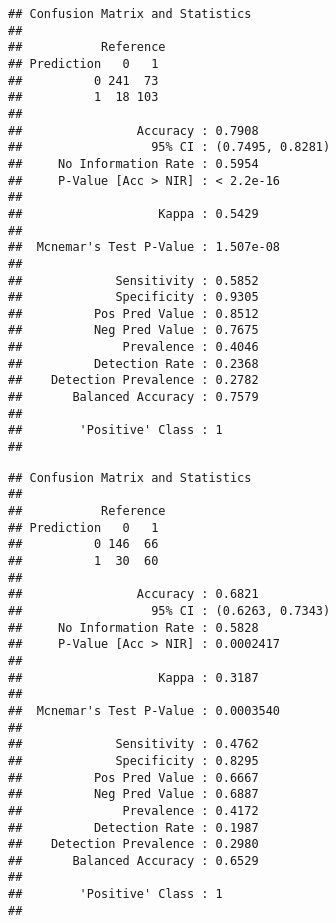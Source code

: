 \documentclass[
]{article}
\newenvironment{Shaded}{\begin{snugshade}}{\end{snugshade}}
\newcommand{\AttributeTok}[1]{\textcolor[rgb]{0.77,0.63,0.00}{#1}}
\newcommand{\CommentTok}[1]{\textcolor[rgb]{0.56,0.35,0.01}{\textit{#1}}}
\newcommand{\FunctionTok}[1]{\textcolor[rgb]{0.00,0.00,0.00}{#1}}
\newcommand{\NormalTok}[1]{#1}
\newcommand{\OtherTok}[1]{\textcolor[rgb]{0.56,0.35,0.01}{#1}}
\newcommand{\SpecialCharTok}[1]{\textcolor[rgb]{0.00,0.00,0.00}{#1}}
\newcommand{\StringTok}[1]{\textcolor[rgb]{0.31,0.60,0.02}{#1}}
\begin{document}
\begin{verbatim}
## Confusion Matrix and Statistics
## 
##           Reference
## Prediction   0   1
##          0 241  73
##          1  18 103
##                                           
##                Accuracy : 0.7908          
##                  95% CI : (0.7495, 0.8281)
##     No Information Rate : 0.5954          
##     P-Value [Acc > NIR] : < 2.2e-16       
##                                           
##                   Kappa : 0.5429          
##                                           
##  Mcnemar's Test P-Value : 1.507e-08       
##                                           
##             Sensitivity : 0.5852          
##             Specificity : 0.9305          
##          Pos Pred Value : 0.8512          
##          Neg Pred Value : 0.7675          
##              Prevalence : 0.4046          
##          Detection Rate : 0.2368          
##    Detection Prevalence : 0.2782          
##       Balanced Accuracy : 0.7579          
##                                           
##        'Positive' Class : 1               
## 
\end{verbatim}

\begin{Shaded}
\end{Shaded}

\begin{verbatim}
## Confusion Matrix and Statistics
## 
##           Reference
## Prediction   0   1
##          0 146  66
##          1  30  60
##                                           
##                Accuracy : 0.6821          
##                  95% CI : (0.6263, 0.7343)
##     No Information Rate : 0.5828          
##     P-Value [Acc > NIR] : 0.0002417       
##                                           
##                   Kappa : 0.3187          
##                                           
##  Mcnemar's Test P-Value : 0.0003540       
##                                           
##             Sensitivity : 0.4762          
##             Specificity : 0.8295          
##          Pos Pred Value : 0.6667          
##          Neg Pred Value : 0.6887          
##              Prevalence : 0.4172          
##          Detection Rate : 0.1987          
##    Detection Prevalence : 0.2980          
##       Balanced Accuracy : 0.6529          
##                                           
##        'Positive' Class : 1               
## 
\end{verbatim}
\end{document}
